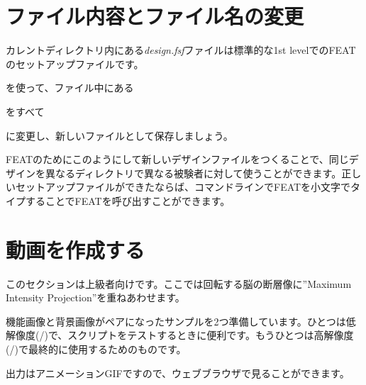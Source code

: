 \documentclass{jsarticle}
\begin{document}
\section{ファイル内容とファイル名の変更}

カレントディレクトリ内にある{\em design.fsf}ファイルは標準的な1st levelでのFEATのセットアップファイルです。

\bigskip

{\color{red}}を使って、ファイル中にある

{\color{red}}

をすべて

{\color{red}}

に変更し、新しいファイルとして保存しましょう。

\bigskip

FEATのためにこのようにして新しいデザインファイルをつくることで、同じデザインを異なるディレクトリで異なる被験者に対して使うことができます。正しいセットアップファイルができたならば、コマンドラインでFEATを小文字でタイプすることでFEATを呼び出すことができます。

{\color{red}}

\section{動画を作成する}

このセクションは上級者向けです。ここでは回転する脳の断層像に''Maximum Intensity Projection''を重ねあわせます。

\bigskip

機能画像と背景画像がペアになったサンプルを2つ準備しています。ひとつは低解像度({\color{red}}/{\color{red}})で、スクリプトをテストするときに便利です。もうひとつは高解像度({\color{red}}/{\color{red}})で最終的に使用するためのものです。

\bigskip

出力はアニメーションGIFですので、ウェブブラウザで見ることができます。

\bigskip
\end{document}
